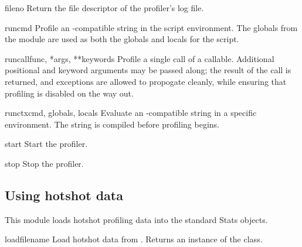 \begin{methoddesc}{fileno}{}
Return the file descriptor of the profiler's log file.
\end{methoddesc}

\begin{methoddesc}{run}{cmd}
Profile an -compatible string in the script environment.
The globals from the  module are used as
both the globals and locals for the script.
\end{methoddesc}

\begin{methoddesc}{runcall}{func, *args, **keywords}
Profile a single call of a callable.
Additional positional and keyword arguments may be passed
along; the result of the call is returned, and exceptions are
allowed to propogate cleanly, while ensuring that profiling is
disabled on the way out.
\end{methoddesc}


\begin{methoddesc}{runctx}{cmd, globals, locals}
Evaluate an -compatible string in a specific environment.
The string is compiled before profiling begins.
\end{methoddesc}

\begin{methoddesc}{start}{}
Start the profiler.
\end{methoddesc}

\begin{methoddesc}{stop}{}
Stop the profiler.
\end{methoddesc}


\subsection{Using hotshot data}



This module loads hotshot profiling data into the standard 
Stats objects.

\begin{funcdesc}{load}{filename}
Load hotshot data from . Returns an instance
of the  class.
\end{funcdesc}

\begin{seealso}
\end{seealso}


